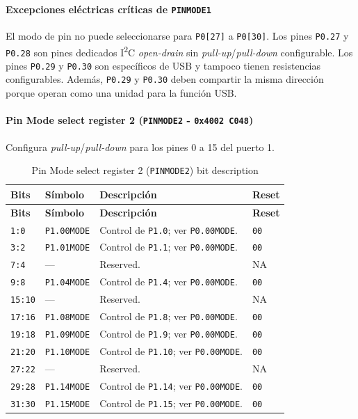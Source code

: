 \paragraph{Excepciones eléctricas críticas de \texttt{PINMODE1}}
El modo de pin no puede seleccionarse para \texttt{P0[27]} a \texttt{P0[30]}. Los pines \texttt{P0.27} y \texttt{P0.28} son pines dedicados I\textsuperscript{2}C \textit{open-drain} sin \textit{pull-up}/\textit{pull-down} configurable. Los pines \texttt{P0.29} y \texttt{P0.30} son específicos de USB y tampoco tienen resistencias configurables. Además, \texttt{P0.29} y \texttt{P0.30} deben compartir la misma dirección porque operan como una unidad para la función USB.

\paragraph{Pin Mode select register 2 (\texttt{PINMODE2} - \texttt{0x4002 C048})}
Configura \textit{pull-up}/\textit{pull-down} para los pines 0 a 15 del puerto 1.

\begin{longtable}{|>{\raggedright\arraybackslash}p{}|>{\raggedright\arraybackslash}p{}|>{\raggedright\arraybackslash}p{}|>{\centering\arraybackslash}p{}|}
\caption{Pin Mode select register 2 (\texttt{PINMODE2}) bit description}\\
\hline
\textbf{Bits} & \textbf{Símbolo} & \textbf{Descripción} & \textbf{Reset} \\
\hline
\endfirsthead
\hline
\textbf{Bits} & \textbf{Símbolo} & \textbf{Descripción} & \textbf{Reset} \\
\hline
\endhead
\texttt{1:0} & \texttt{P1.00MODE} & Control de \texttt{P1.0}; ver \texttt{P0.00MODE}. & \texttt{00} \\
\hline
\texttt{3:2} & \texttt{P1.01MODE} & Control de \texttt{P1.1}; ver \texttt{P0.00MODE}. & \texttt{00} \\
\hline
\texttt{7:4} & --- & Reserved. & NA \\
\hline
\texttt{9:8} & \texttt{P1.04MODE} & Control de \texttt{P1.4}; ver \texttt{P0.00MODE}. & \texttt{00} \\
\hline
\texttt{15:10} & --- & Reserved. & NA \\
\hline
\texttt{17:16} & \texttt{P1.08MODE} & Control de \texttt{P1.8}; ver \texttt{P0.00MODE}. & \texttt{00} \\
\hline
\texttt{19:18} & \texttt{P1.09MODE} & Control de \texttt{P1.9}; ver \texttt{P0.00MODE}. & \texttt{00} \\
\hline
\texttt{21:20} & \texttt{P1.10MODE} & Control de \texttt{P1.10}; ver \texttt{P0.00MODE}. & \texttt{00} \\
\hline
\texttt{27:22} & --- & Reserved. & NA \\
\hline
\texttt{29:28} & \texttt{P1.14MODE} & Control de \texttt{P1.14}; ver \texttt{P0.00MODE}. & \texttt{00} \\
\hline
\texttt{31:30} & \texttt{P1.15MODE} & Control de \texttt{P1.15}; ver \texttt{P0.00MODE}. & \texttt{00} \\
\hline
\end{longtable}

